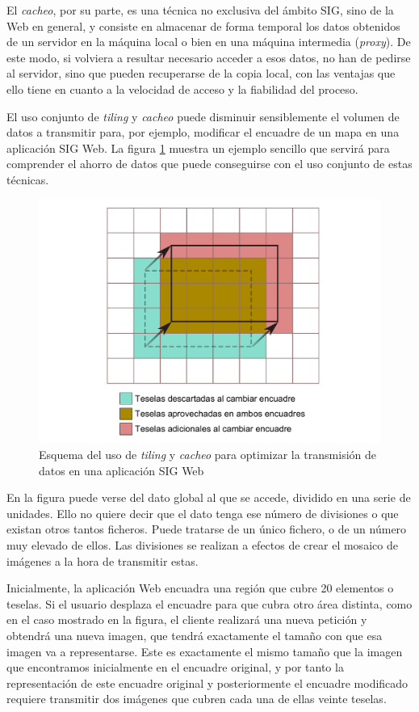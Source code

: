 El \emph{cacheo}, por su parte, es una técnica no exclusiva del ámbito SIG, sino de la Web en general, y consiste en almacenar de forma temporal los datos obtenidos de un servidor en la máquina local o bien en una máquina intermedia (\emph{proxy}). De este modo, si volviera a resultar necesario acceder a esos datos, no han de pedirse al servidor, sino que pueden recuperarse de la copia local, con las ventajas que ello tiene en cuanto a la velocidad de acceso y la fiabilidad del proceso.

El uso conjunto de \emph{tiling} y \emph{cacheo} puede disminuir sensiblemente el volumen de datos a transmitir para, por ejemplo, modificar el encuadre de un mapa en una aplicación SIG Web. La figura \ref{Fig:Tiling} muestra un ejemplo sencillo que servirá para comprender el ahorro de datos que puede conseguirse con el uso conjunto de estas técnicas.

\begin{figure}[!hbt]   
\centering
\includegraphics[width=.8\textwidth]{Cliente_servidor/Tiling.pdf}
\caption{\small Esquema del uso de \emph{tiling} y \emph{cacheo} para optimizar la transmisión de datos en una aplicación SIG Web}
\label{Fig:Tiling} 
\end{figure}

En la figura puede verse del dato global al que se accede, dividido en una serie de unidades. Ello no quiere decir que el dato tenga ese número de divisiones o que existan otros tantos ficheros. Puede tratarse de un único fichero, o de un número muy elevado de ellos. Las divisiones se realizan a efectos de crear el mosaico de imágenes a la hora de transmitir estas.

Inicialmente, la aplicación Web encuadra una región que cubre 20 elementos o teselas. Si el usuario desplaza el encuadre para que cubra otro área distinta, como en el caso mostrado en la figura, el cliente realizará una nueva petición y obtendrá una nueva imagen, que tendrá exactamente el tamaño con que esa imagen va a representarse. Este es exactamente el mismo tamaño que la imagen que encontramos inicialmente en el encuadre original, y por tanto la representación de este encuadre original y posteriormente el encuadre modificado requiere transmitir dos imágenes que cubren cada una de ellas veinte teselas.

